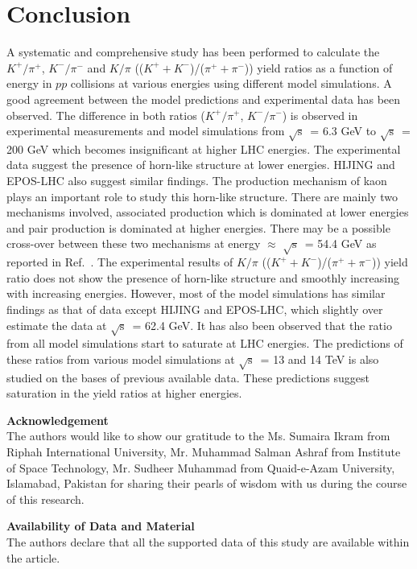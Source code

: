 \documentclass{article}
\newcommand{\sqrts}{\mbox{$\sqrt{\mathrm{s}}$}}
\begin{document}


\section{Conclusion}\label{sec4}


A systematic and comprehensive study has been performed to calculate the $K^+/\pi^+$, $K^-/\pi^-$ and $K/\pi$ (($K^+ + K^-$)/($\pi^+ + \pi^-$)) yield ratios as a function of energy in $pp$ collisions at various energies using different model simulations. A good agreement between the model predictions and experimental data has been observed. The difference in both ratios ($K^+/\pi^+$, $K^-/\pi^-$) is observed in experimental measurements and model simulations from \sqrts~= 6.3 GeV to \sqrts~= 200 GeV which becomes insignificant at higher LHC energies. The experimental data suggest the presence of horn-like structure at lower energies. HIJING and EPOS-LHC also suggest similar findings. The production mechanism of kaon plays an important role to study this horn-like structure. There are mainly two mechanisms involved, associated production which is dominated at lower energies and pair production is dominated at higher energies. There may be a possible cross-over between these two mechanisms at energy $\approx$ \sqrts~= 54.4 GeV as reported in Ref.~\cite{Ashraf:2021nkb}. The experimental results of $K/\pi$ (($K^+ + K^-$)/($\pi^+ + \pi^-$)) yield ratio does not show the presence of horn-like structure and smoothly increasing with increasing energies. However, most of the model simulations has similar findings as that of data except HIJING and EPOS-LHC, which slightly over estimate the data at \sqrts~= 62.4 GeV. It has also been observed that the ratio from all model simulations start to saturate at LHC energies. The predictions of these ratios from various model simulations at \sqrts~= 13 and 14 TeV is also studied on the bases of previous available data. These predictions suggest saturation in the yield ratios at higher energies.  

\vskip0.5cm
\textbf{Acknowledgement}\\
The authors would like to show our gratitude to the Ms. Sumaira Ikram from Riphah International University, Mr. Muhammad Salman Ashraf from Institute of Space Technology, Mr. Sudheer Muhammad from Quaid-e-Azam University, Islamabad, Pakistan for sharing their pearls of wisdom with us during the course of this research. 

\vskip0.5cm
\textbf{Availability of Data and Material}\\
The authors declare that all the supported data of this study are available within the article.








\end{document}
